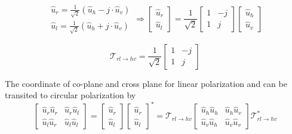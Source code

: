 \documentclass[draftcls]{IEEEtran}
\begin{document}
\begin{equation*}
	\begin{matrix}
	\hat{u}_{r} = \frac{1}{\sqrt{2}}(\hat{u}_h - j\cdot \hat{u}_v) \\
	\hat{u}_{l} = \frac{1}{\sqrt{2}}(\hat{u}_h + j\cdot \hat{u}_v)
	\end{matrix}
	\Rightarrow 
	\begin{bmatrix}
	\hat{u}_{r} \\
	\hat{u}_{l}
	\end{bmatrix}= \frac{1}{\sqrt{2}}	 
	\begin{bmatrix}
	1 & -j \\
	1 & j
	\end{bmatrix}	
	\begin{bmatrix}
	\hat{u}_{h} \\
	\hat{u}_{v}
	\end{bmatrix}
\end{equation*}

\begin{equation}
	\mathcal{T}_{rl \rightarrow hv} =  \frac{1}{\sqrt{2}}	
	\begin{bmatrix}
	1 & -j \\
	1 & j
	\end{bmatrix}
\end{equation}

The coordinate of co-plane and cross plane for linear polarization and  can be transited to circular polarization by
\begin{equation}
 	\begin{bmatrix}
	\hat{u}_{r}\hat{u}_{r} & \hat{u}_{r}\hat{u}_{l} \\
	\hat{u}_{l}\hat{u}_{r} & \hat{u}_{l}\hat{u}_{l}
	\end{bmatrix} = 
	\begin{bmatrix}
	\hat{u}_{r} \\
	\hat{u}_{l} 
	\end{bmatrix}
	\begin{bmatrix}
	\hat{u}_{r} \\
	\hat{u}_{l} 
	\end{bmatrix}^* = 
	\mathcal{T}_{rl \rightarrow hv}
	\begin{bmatrix}
	\hat{u}_{h}\hat{u}_{h} & \hat{u}_{h}\hat{u}_{v} \\
	\hat{u}_{v}\hat{u}_{h} & \hat{u}_{v}\hat{u}_{v}
	\end{bmatrix}
	\mathcal{T}_{rl \rightarrow hv}^*
\end{equation}
\end{document}
